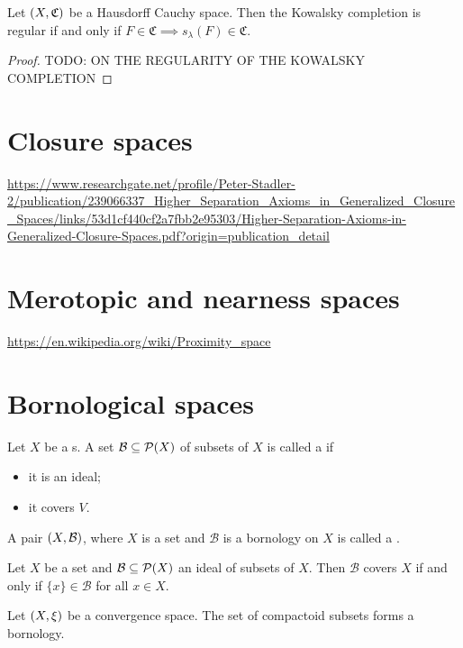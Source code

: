 \begin{proposition}
Let $\sSet{X, \mathfrak{C}}$ be a Hausdorff Cauchy space. Then the Kowalsky completion is regular \textup{if and only if} $F\in \mathfrak{C} \implies s_\lambda(F) \in \mathfrak{C}$.
\end{proposition}
\begin{proof}
TODO: ON THE REGULARITY OF THE KOWALSKY
COMPLETION
\end{proof}

\section{Closure spaces}
\url{https://www.researchgate.net/profile/Peter-Stadler-2/publication/239066337_Higher_Separation_Axioms_in_Generalized_Closure_Spaces/links/53d1cf440cf2a7fbb2e95303/Higher-Separation-Axioms-in-Generalized-Closure-Spaces.pdf?origin=publication_detail}

\section{Merotopic and nearness spaces}
\url{https://en.wikipedia.org/wiki/Proximity_space}

\section{Bornological spaces}
\begin{definition}
Let $X$ be a s. A set $\mathcal{B}\subseteq \operatorname{\mathcal{P}}(X)$ of subsets of $X$ is called a  if
\begin{itemize}
\item it is an ideal;
\item it covers $V$.
\end{itemize}
A pair $\sSet{X,\mathcal{B}}$, where $X$ is a set and $\mathcal{B}$ is a bornology on $X$ is called a .
\end{definition}

\begin{lemma}
Let $X$ be a set and $\mathcal{B}\subseteq \operatorname{\mathcal{P}}(X)$ an ideal of subsets of $X$. Then $\mathcal{B}$ covers $X$ \textup{if and only if} $\{x\}\in \mathcal{B}$ for all $x\in X$.
\end{lemma}

\begin{example}
Let $\sSet{X,\xi}$ be a convergence space. The set of compactoid subsets forms a bornology.
\end{example}



